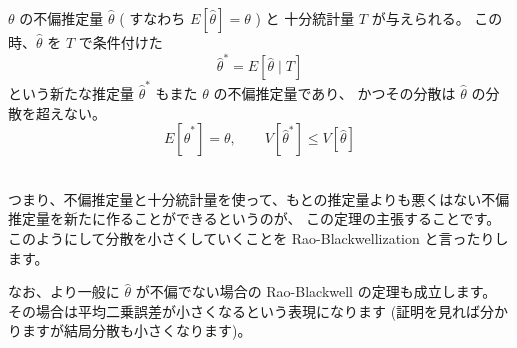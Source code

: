 \documentclass[./main.tex]{subfiles}
\begin{document}
\begin{enumerate}
        \begin{theorem}
            $\theta$ の不偏推定量 $\hat{\theta}$ ( すなわち $E[\hat{\theta}] = \theta$ ) と
            十分統計量 $T$ が与えられる。
            この時、$\hat{\theta}$ を $T$ で条件付けた
            \begin{equation*}
                \hat{\theta}^* = E[\hat{\theta} \mid T]
            \end{equation*}
            という新たな推定量 $\hat{\theta}^*$ もまた $\theta$ の不偏推定量であり、
            かつその分散は $\hat{\theta}$ の分散を超えない。
            \begin{equation*}
                E[\hat{\theta}^*] = \theta, \qquad
                V[\hat{\theta}^*] \leq V [\hat{\theta}]
            \end{equation*}
        \end{theorem}

        \ \\つまり、不偏推定量と十分統計量を使って、もとの推定量よりも悪くはない不偏推定量を新たに作ることができるというのが、
        この定理の主張することです。
        このようにして分散を小さくしていくことを Rao-Blackwellization と言ったりします。

        なお、より一般に $\hat{\theta}$ が不偏でない場合の Rao-Blackwell の定理も成立します。
        その場合は平均二乗誤差が小さくなるという表現になります (証明を見れば分かりますが結局分散も小さくなります)。


\end{enumerate}
\end{document}
